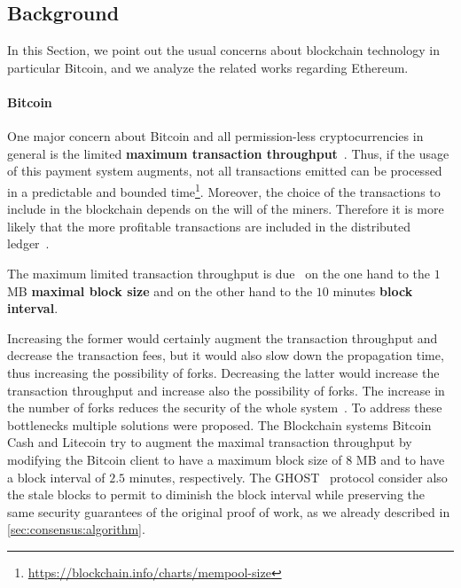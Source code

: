 \subsection{Background}
\label{sec:background}

In this Section, we point out the usual concerns about blockchain technology in
particular Bitcoin, and we analyze the related works regarding Ethereum.

\paragraph{Bitcoin} One major concern about Bitcoin and all permission-less
cryptocurrencies in general is the limited \textbf{maximum transaction
throughput}~\cite{bib:blockchain-challenges-opportunites-survey, bib:taxonomy,
bib:scaling-croman}. Thus, if the usage of this payment system augments, not all
transactions emitted can be processed in a predictable and bounded
time\footnote{\url{https://blockchain.info/charts/mempool-size}}. Moreover, the
choice of the transactions to include in the blockchain depends on the will of
the miners. Therefore it is more likely that the more profitable transactions
are included in the distributed
ledger~\cite{bib:blockchain-challenges-opportunites-survey,wood2018ethereum}.

The maximum limited transaction throughput is due~\cite{bib:ghost,
bib:scaling-croman} on the one hand to the $1$ MB \textbf{maximal block size}
and on the other hand to the $10$ minutes \textbf{block interval}.

Increasing the former would certainly augment the transaction throughput and
decrease the transaction fees, but it would also slow down the propagation time,
thus increasing the possibility of forks. Decreasing the latter would increase
the transaction throughput and increase also the possibility of forks. The
increase in the number of forks reduces the security of the whole
system~\cite{bib:ghost}. To address these bottlenecks multiple solutions were
proposed. The Blockchain systems Bitcoin Cash and Litecoin try to augment the
maximal transaction throughput by modifying the Bitcoin client to have a maximum
block size of $8$ MB and to have a block interval of $2.5$ minutes,
respectively. The GHOST~\cite{bib:ghost} protocol consider also the stale blocks
to permit to diminish the block interval while preserving the same security
guarantees of the original proof of work, as we already described in
\autoref{sec:consensus:algorithm}.

